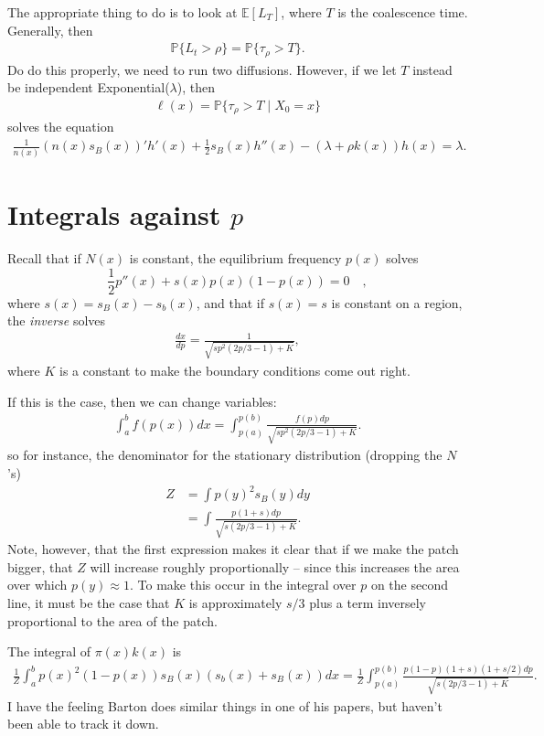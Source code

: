\documentclass{article}
\newcommand{\E}{\mathbb{E}}
\renewcommand{\P}{\mathbb{P}}
\newcommand{\given}{\;\vert\;}
\begin{document}
The appropriate thing to do is to look at $\E[L_T]$, where $T$ is the coalescence time.
Generally, then
\begin{align}
  \P\{ L_t > \rho \} = \P\{ \tau_\rho > T \} .
\end{align}
Do do this properly, we need to run two diffusions.
However, if we let $T$ instead be independent Exponential($\lambda$), then 
\begin{align}
  \ell(x) = \P\{ \tau_\rho > T \given X_0 = x\} 
\end{align}
solves the equation
\begin{align}
  \frac{1}{n(x)}(n(x)s_B(x))' h'(x) + \frac{1}{2} s_B(x) h''(x) - (\lambda + \rho k(x)) h(x) = \lambda .
\end{align}


\section{Integrals against $p$}

Recall that if $N(x)$ is constant, the equilibrium frequency $p(x)$ solves
\[ \frac{1}{2} p''(x) + s(x) p(x)(1-p(x)) = 0 \quad ,\]
where $s(x) = s_B(x)-s_b(x)$,
and that if $s(x) = s$ is constant on a region, the \emph{inverse} solves
\begin{align}
  \frac{dx}{dp} = \frac{1}{\sqrt{sp^2(2p/3-1) + K}},
\end{align}
where $K$ is a constant to make the boundary conditions come out right.

If this is the case, then we can change variables:
\begin{align}
  \int_a^b f(p(x)) dx = \int_{p(a)}^{p(b)} \frac{f(p) dp }{\sqrt{sp^2(2p/3-1) + K}} .
\end{align}
so for instance, 
the denominator for the stationary distribution (dropping the $N$'s)
\begin{align}
  Z &= \int p(y)^2 s_B(y) dy \\
  &= \int \frac{ p (1+s) dp }{ \sqrt{ s (2p/3-1) + K } } .
\end{align}
Note, however, that the first expression makes it clear that if we make the patch bigger, that $Z$ will increase roughly proportionally
-- since this increases the area over which $p(y)\approx 1$.
To make this occur in the integral over $p$ on the second line, 
it must be the case that $K$ is approximately $s/3$ plus a term inversely proportional to the area of the patch.


The integral of $\pi(x) k(x)$ is
\begin{align}
  \frac{1}{Z} \int_a^b p(x)^2(1-p(x))s_B(x)(s_b(x)+s_B(x)) dx = \frac{1}{Z} \int_{p(a)}^{p(b)} \frac{p (1-p) (1+s)(1+s/2) dp }{\sqrt{s(2p/3-1) + K}} .
\end{align}
I have the feeling Barton does similar things in one of his papers,
but haven't been able to track it down.
\end{document}
